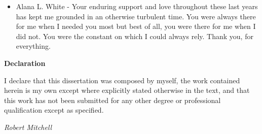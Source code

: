 \documentclass[a4paper,11pt,twoside,openright]{article}
\begin{document}
\begin{flushleft}
{\begin{itemize}
    \item{Alana L. White - Your enduring support and love throughout
      these last years has kept me grounded in an otherwise turbulent
      time. You were always there for me when I needed you most but
      best of all, you were there for me when I did not. You were the
      constant on which I could always rely. Thank you, for everything.}
    \end{itemize}
  }
\end{flushleft}

\newpage
\thispagestyle{empty}
\mbox{}
\newpage

\centering
{\LARGE\textbf{Declaration}}
\begin{flushleft}
  {\small
    I declare that this dissertation was composed by myself, the work
    contained herein is my own except where explicitly stated otherwise
    in the text, and that this work has not been submitted for any other
    degree or professional qualification except as specified.
    \par

    \textit{Robert Mitchell}}

\end{flushleft}

\newpage
\thispagestyle{empty}
\mbox{}
\newpage
\end{document}
